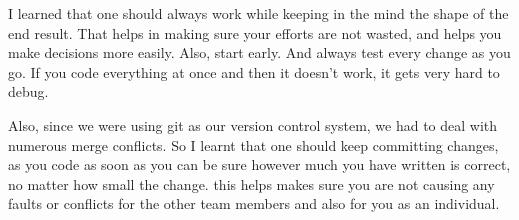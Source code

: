 I learned that one should always work while keeping in the mind the shape of the end result. That helps in making sure your efforts are not wasted, and helps you make decisions more easily. Also, start early. And always test every change as you go. If you code everything at once and then it doesn't work, it gets very hard to debug.

Also, since we were using git as our version control system, we had to deal with numerous merge conflicts. So I learnt that one should keep committing changes, as you code as soon as you can be sure however much you have written is correct, no matter how small the change. this helps makes sure you are not causing any faults or conflicts for the other team members and also for you as an individual.